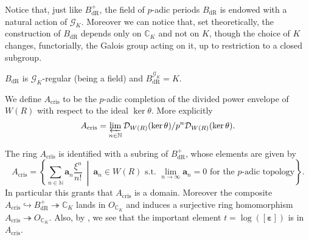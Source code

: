 \begin{rem}[]
	Notice that, just like $B_{\mathrm{dR}}^+$, the field of $p$-adic periods
	$B_{\mathrm{dR}}$ is endowed with a natural action of $\mathscr{G}_K$.
	Moreover we can notice that, set theoretically, the construction of
	$B_{\mathrm{dR}}$ depends only on $\mathbb{C}_K$ and not on $K$,
	though the choice of $K$ changes, functorially, the Galois group acting on it,
	up to restriction to a closed subgroup.
\end{rem}


\begin{prop}
	$B_{\mathrm{dR}}$ is $\mathscr{G}_K$-regular
	(being a field) and $B_{\mathrm{dR}}^{\mathscr{G}_K} = K$.
\end{prop}


\begin{defn}[]
	We define $A_{\mathrm{cris}}$ to be the $p$-adic completion of the
	divided power envelope of $W(R)$ with respect to the ideal $\ker \theta$.
	More explicitly
	\begin{equation*}
		A_{\mathrm{cris}} = \varprojlim_{n \in \mathbb{N}} 
		\mathcal{D}_{W(R)}(\ker\theta)/p^n\mathcal{D}_{W(R)}(\ker\theta)
	.\end{equation*}
\end{defn}


\begin{rem}
	The ring $A_{\mathrm{cris}}$ is identified with a subring
	of $B_{\mathrm{dR}}^+$, whose elements are given by
	\begin{equation*}
	A_{\mathrm{cris}} = 
	\left\{ \sum_{n \in \mathbb{N} }^{  } \mathbf{a}_n \frac{ \xi^n }{ n! } \ \middle|\ 
	\mathbf{a}_n \in W(R) \text{ s.t. } \lim_{n \to \infty} \mathbf{a}_n = 0
	\text{ for the $p$-adic topology}\right\}
	.\end{equation*}
	In particular this grants that $A_{\mathrm{cris}}$ is a domain.
	Moreover the composite $A_{\mathrm{cris}} \hookrightarrow B_{\mathrm{dR}}^+ 
	\twoheadrightarrow \mathbb{C}_K$ lands in $O_{\mathbb{C}_K}$
	and induces a surjective ring homomorphism $A_{\mathrm{cris}} \twoheadrightarrow O_{\mathbb{C}_K}$.
	Also, by {\cite[Proposition 9.1.3]{Brinon}}, we see that the important
	element $t = \log ([\boldsymbol\varepsilon])$ is in $A_{\mathrm{cris}}$.
\end{rem}


